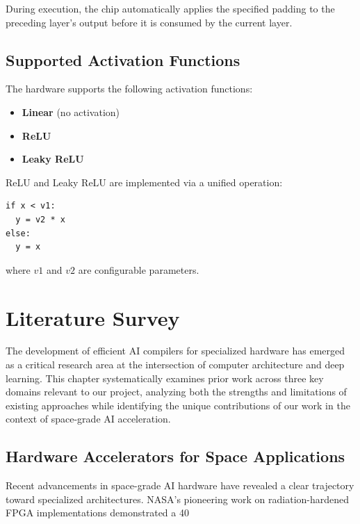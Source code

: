 \documentclass[12pt]{report}
\begin{document}
During execution, the chip automatically applies the specified padding to the preceding layer's output before it is consumed by the current layer.

\section{Supported Activation Functions}

The hardware supports the following activation functions:
\begin{itemize}
    \item \textbf{Linear} (no activation)
    \item \textbf{ReLU}
    \item \textbf{Leaky ReLU}
\end{itemize}

\noindent ReLU and Leaky ReLU are implemented via a unified operation:
\begin{verbatim}
if x < v1:
  y = v2 * x
else:
  y = x
\end{verbatim}

\noindent where $v1$ and $v2$ are configurable parameters.

\chapter{Literature Survey}

The development of efficient AI compilers for specialized hardware has emerged as a critical research area at the intersection of computer architecture and deep learning. This chapter systematically examines prior work across three key domains relevant to our project, analyzing both the strengths and limitations of existing approaches while identifying the unique contributions of our work in the context of space-grade AI acceleration.

\section{Hardware Accelerators for Space Applications}
Recent advancements in space-grade AI hardware have revealed a clear trajectory toward specialized architectures. NASA's pioneering work on radiation-hardened FPGA implementations \cite{nasa2020} demonstrated a 40%
\end{document}
